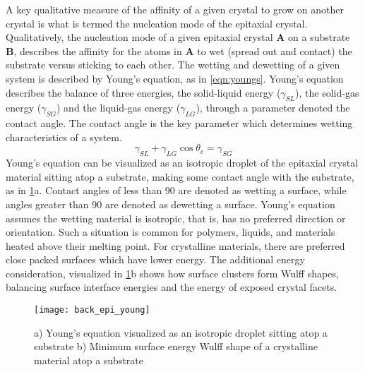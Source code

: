 A key qualitative measure of the affinity of a given crystal to grow on another crystal is what is termed the nucleation mode of the epitaxial crystal. Qualitatively, the nucleation mode of a given epitaxial crystal \textbf{A} on a substrate \textbf{B}, describes the affinity for the atoms in \textbf{A} to wet (spread out and contact) the substrate versus sticking to each other. The wetting and dewetting of a given system is described by Young's equation, as in \cref{eqn:youngs}. Young's equation describes the balance of three energies, the solid-liquid energy ($\gamma_{SL}$), the solid-gas energy ($\gamma_{SG}$) and the liquid-gas energy ($\gamma_{LG}$), through a parameter denoted the contact angle. The contact angle is the key parameter which determines wetting characteristics of a system.
\begin{equation}
\gamma_{SL} + \gamma_{LG} \cos{\theta_c} = \gamma_{SG} \label{eqn:youngs}
\end{equation}
Young's equation can be visualized as an isotropic droplet of the epitaxial crystal material sitting atop a substrate, making some contact angle with the substrate, as in \cref{fig:back_epi_young}a. Contact angles of less than 90\degree{} are denoted as wetting a surface, while angles greater than 90\degree{} are denoted as dewetting a surface. Young's equation assumes the wetting material is isotropic, that is, has no preferred direction or orientation. Such a situation is common for polymers, liquids, and materials heated above their melting point. For crystalline materials, there are preferred close packed surfaces which have lower energy. The additional energy consideration, visualized in \cref{fig:back_epi_young}b shows how surface clusters form Wulff shapes, balancing surface interface energies and the energy of exposed crystal facets.
\begin{figure}
    \centering
    \texttt{[image: back\_epi\_young]}
    \caption[Young's equation]{\label{fig:back_epi_young}a) Young's equation visualized as an isotropic droplet sitting atop a substrate b) Minimum surface energy Wulff shape of a crystalline material atop a substrate \cite{wikipedia_surface_energy}}
\end{figure}

